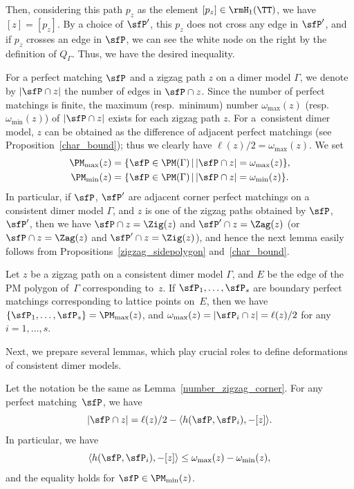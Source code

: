 \begin{observation}[{cf.~\cite[Section~5.3]{IU2}}]
Then, considering this path $p_z$ as the element $[p_z]\in\rmH_1(\TT)$, we have $[z]=[p_z]$.
By a choice of $\sfP^\prime$, this $p_z$ does not cross any edge in $\sfP^\prime$, and if $p_z$ crosses an edge in $\sfP$, we can see the white node on the right by the definition of $Q_\Gamma$. Thus, we have the desired inequality.
\end{observation}

For a perfect matching $\sfP$ and a zigzag path $z$ on a dimer model $\Gamma$, we denote by $|\sfP\cap z|$ the number of edges in $\sfP\cap z$.
Since the number of perfect matchings is finite, the maximum (resp.\ minimum) number $\omega_{\max}(z)$ (resp.\ $\omega_{\min}(z)$) of $|\sfP\cap z|$ exists for each zigzag path $z$.
For a~consistent dimer model, $z$ can be obtained as the difference of adjacent perfect matchings (see Proposition~\ref{char_bound});
thus we clearly have $\ell(z)/2=\omega_{\max}(z)$.
We set
\begin{gather*}
\PM_{\max}(z)=\{\sfP\in\PM(\Gamma) \,|\, |\sfP\cap z|=\omega_{\max}(z)\},
\\
\PM_{\min}(z)=\{\sfP\in\PM(\Gamma) \,|\, |\sfP\cap z|=\omega_{\min}(z)\}.
\end{gather*}
In particular, if $\sfP$, $\sfP^\prime$ are adjacent corner perfect matchings on a consistent dimer model $\Gamma$, and $z$ is one of the zigzag paths obtained by $\sfP$, $\sfP^\prime$, then we have $\sfP\cap z=\Zig(z)$ and $\sfP^\prime\cap z=\Zag(z)$ (or $\sfP\cap z=\Zag(z)$ and $\sfP^\prime\cap z=\Zig(z)$),
and hence the next lemma easily follows from Propositions~\ref{zigzag_sidepolygon} and~\ref{char_bound}.

\begin{Lemma}\label{number_zigzag_corner}
Let $z$ be a zigzag path on a consistent dimer model $\Gamma$, and $E$ be the edge of the PM polygon of~$\Gamma$ corresponding to~$z$.
If $\sfP_1,\dots,\sfP_s$ are boundary perfect matchings corresponding to lattice points on~$E$, then we have
$\{\sfP_1,\dots,\sfP_s\}=\PM_{\max}(z)$, and $\omega_{\max}(z)=|\sfP_i\cap z|=\ell(z)/2$ for any $i=1,\dots,s$.
\end{Lemma}

Next, we prepare several lemmas, which play crucial roles to define deformations of consistent dimer models.

\begin{Lemma}\label{zigzag_lem1}
Let the notation be the same as Lemma~{\rm \ref{number_zigzag_corner}}.
For any perfect matching~$\sfP$, we have
\begin{displaymath}
|\sfP\cap z|=\ell(z)/2-\langle h(\sfP,\sfP_i),-[z]\rangle.
\end{displaymath}
In particular, we have
\begin{displaymath}
\langle h(\sfP,\sfP_i),-[z]\rangle\le \omega_{\max}(z)-\omega_{\min}(z),
\end{displaymath}
and the equality holds for $\sfP\in \PM_{\min}(z)$.
\end{Lemma}

